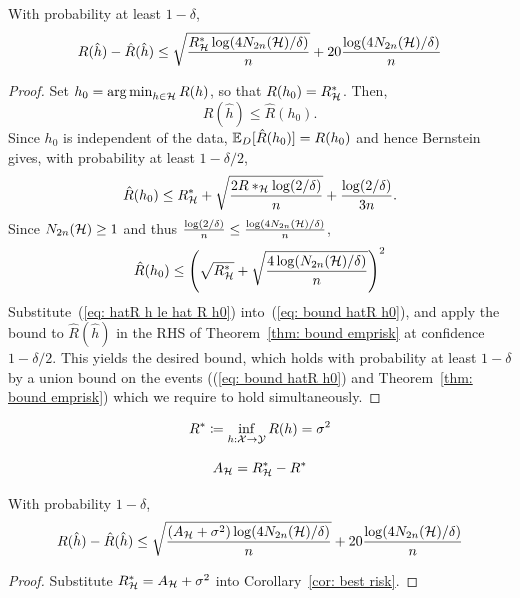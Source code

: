 \documentclass[reqno]{amsart}
\begin{document}
\begin{corollary}\label{cor: best risk}
    With probability at least $1-\delta$,
    \[
    R(\hat h) - \hat R(\hat h) \le \sqrt{\frac{R^*_{\mathcal{H}}\log(4N_{2n}(\mathcal{H})/\delta)}{n}} + 20\frac{\log(4N_{2n}(\mathcal{H})/\delta)}{n}
    \]
    \begin{proof}
        Set $h_0 = \operatorname*{arg\,min}_{h\in\mathcal{H}} R(h)$, so that $R(h_0) = R^*_{\mathcal{H}}$. Then,
        \begin{equation}\label{eq: hatR h le hat R h0}
        \hat R(\hat h) \le \hat R(h_0).
        \end{equation}
        Since $h_0$ is independent of the data, $\mathbb{E}_D[\hat R(h_0)] = R(h_0)$ and hence Bernstein gives, with probability at least $1-\delta/2$,
        \[
        \hat R(h_0) \le R^*_{\mathcal{H}} + \sqrt{\frac{2R*_{\mathcal{H}} \log (2/\delta)}{n}} + \frac{\log(2/\delta)}{3n}.
        \]
        Since $N_{2n}(\mathcal{H})\ge 1$ and thus $\frac{\log (2/\delta)}{n}\le \frac{\log(4N_{2n}(\mathcal{H})/\delta)}{n}$,
        \begin{equation}\label{eq: bound hatR h0}
        \hat R(h_0) \le \left(\sqrt{R^*_{\mathcal{H}}} + \sqrt{\frac{4\log(N_{2n}(\mathcal{H})/\delta)}{n}}\right)^2
        \end{equation}
        Substitute~(\ref{eq: hatR h le hat R h0}) into~(\ref{eq: bound hatR h0}), and apply the bound to $\hat R(\hat h)$ in the RHS of Theorem~\ref{thm: bound emprisk} at confidence $1-\delta/2$. This yields the desired bound, which holds with probability at least $1-\delta$ by a union bound on the events ((\ref{eq: bound hatR h0}) and Theorem~\ref{thm: bound emprisk}) which we require to hold simultaneously.
    \end{proof}
    
\end{corollary}

\begin{definition}
    \[
     R^*\coloneq\inf_{h:\mathcal{X}\to\mathcal{Y}} R(h)  = \sigma^2
    \]
\end{definition}

\begin{definition}
    \[
    A_{\mathcal{H}} = R^*_{\mathcal{H}} - R^*
    \]
\end{definition}

\begin{corollary}\label{cor: noiseandappr bound}
With probability $1-\delta$,
\begin{equation}
    R(\hat h) - \hat R(\hat h) \le \sqrt{\frac{(A_{\mathcal{H}} + \sigma^2)\log(4N_{2n}(\mathcal{H})/\delta)}{n}} + 20\frac{\log(4N_{2n}(\mathcal{H})/\delta)}{n}
\end{equation}
\begin{proof}
    Substitute $R^*_{\mathcal{H}} = A_{\mathcal{H}} + \sigma^2$ into Corollary~\ref{cor: best risk}.
\end{proof}
\end{corollary}
\end{document}

